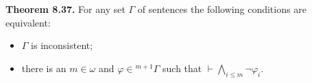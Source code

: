 \textbf{Theorem 8.37.} For any set $\Gamma$ of sentences the following conditions are equivalent:

\begin{itemize}
  \item[(i)] $\Gamma$ is inconsistent;
  \item[(ii)] there is an $m \in \omega$ and $\varphi \in {}^{m+1}\Gamma$ such that $\vdash \bigwedge_{i \leq m} \neg \varphi_i$.
\end{itemize}
